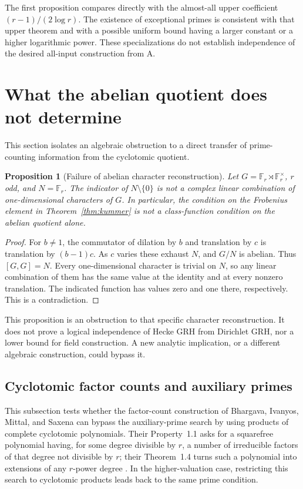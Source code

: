 \documentclass[11pt]{article}
\newcommand{\F}{\mathbb F}
\newtheorem{proposition}[theorem]{Proposition}
\theoremstyle{definition}
\theoremstyle{remark}
\begin{document}
The first proposition compares directly with the almost-all upper
coefficient $(r-1)/(2\log r)$.  The existence of exceptional
primes is consistent with that upper theorem and with a possible
uniform bound having a larger constant or a higher logarithmic
power.  These specializations do not establish independence of the
desired all-input construction from A.


\section{What the abelian quotient does not determine}
This section isolates an algebraic obstruction to a direct transfer of
prime-counting information from the cyclotomic quotient.

\begin{proposition}[Failure of abelian character reconstruction]
\label{prop:abelianobstruction}
Let $G=\F_r\rtimes\F_r^\times$, $r$ odd, and
$N=\F_r$.  The indicator of $N\setminus\{0\}$ is not
a complex linear combination of one-dimensional characters of $G$.
In particular, the condition on the Frobenius element in
Theorem~\ref{thm:kummer} is not a class-function condition
on the abelian quotient alone.
\end{proposition}
\begin{proof}
For $b\ne1$, the commutator of dilation by $b$ and
translation by $c$ is translation by $(b-1)c$.
As $c$ varies these exhaust $N$, and $G/N$ is abelian.
Thus $[G,G]=N$.  Every one-dimensional character is
trivial on $N$, so any linear combination of them has
the same value at the identity and at every nonzero
translation.  The indicated function has values zero
and one there, respectively.  This is a contradiction.
\end{proof}

This proposition is an obstruction to that specific character
reconstruction.  It does not prove a logical independence of
Hecke GRH from Dirichlet GRH, nor a lower bound for field
construction.  A new analytic implication, or a different
algebraic construction, could bypass it.

\subsection{Cyclotomic factor counts and auxiliary primes}

This subsection tests whether the factor-count construction of
Bhargava, Ivanyos, Mittal, and Saxena can bypass the auxiliary-prime search
by using products of complete cyclotomic polynomials.
Their Property~1.1 asks for a squarefree polynomial having, for some degree
divisible by $r$, a number of irreducible factors of that degree not divisible
by $r$; their Theorem~1.4 turns such a polynomial into extensions of any
$r$-power degree \cite[p.~2]{BhargavaEtAl2017}.
In the higher-valuation case, restricting this search to cyclotomic
products leads back to the same prime condition.
\end{document}
